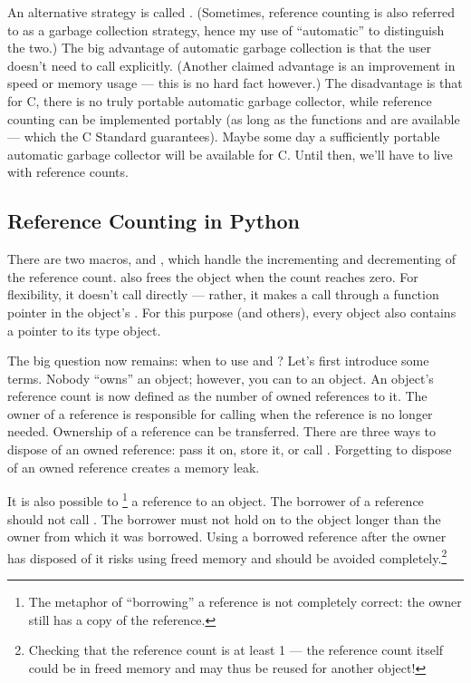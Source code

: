 An alternative strategy is called .
(Sometimes, reference counting is also referred to as a garbage
collection strategy, hence my use of ``automatic'' to distinguish the
two.)  The big advantage of automatic garbage collection is that the
user doesn't need to call  explicitly.  (Another claimed
advantage is an improvement in speed or memory usage --- this is no
hard fact however.)  The disadvantage is that for C, there is no
truly portable automatic garbage collector, while reference counting
can be implemented portably (as long as the functions 
and  are available --- which the C Standard guarantees).
Maybe some day a sufficiently portable automatic garbage collector
will be available for C.  Until then, we'll have to live with
reference counts.

\subsection{Reference Counting in Python}

There are two macros,  and ,
which handle the incrementing and decrementing of the reference count.
 also frees the object when the count reaches zero.
For flexibility, it doesn't call  directly --- rather, it
makes a call through a function pointer in the object's .  For this purpose (and others), every object also contains a
pointer to its type object.

The big question now remains: when to use  and
?  Let's first introduce some terms.  Nobody
``owns'' an object; however, you can  to an
object.  An object's reference count is now defined as the number of
owned references to it.  The owner of a reference is responsible for
calling  when the reference is no longer needed.
Ownership of a reference can be transferred.  There are three ways to
dispose of an owned reference: pass it on, store it, or call
.  Forgetting to dispose of an owned reference creates
a memory leak.

It is also possible to \footnote{The metaphor of
``borrowing'' a reference is not completely correct: the owner still
has a copy of the reference.} a reference to an object.  The borrower
of a reference should not call .  The borrower must
not hold on to the object longer than the owner from which it was
borrowed.  Using a borrowed reference after the owner has disposed of
it risks using freed memory and should be avoided
completely.\footnote{Checking that the reference count is at least 1
 --- the reference count itself could be in
freed memory and may thus be reused for another object!}

